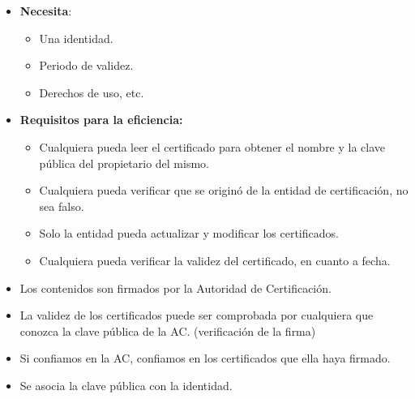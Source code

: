 \documentclass[12pt, twoside, openright]{report} %
\begin{document}
\begin{itemize}
\begin{itemize}
		            \begin{itemize}
			            \item \textbf{Necesita}:
			                  \begin{itemize}
				                  \item Una identidad.
				                  \item Periodo de validez.
				                  \item Derechos de uso, etc.
			                  \end{itemize}
			            \item \textbf{Requisitos para la eficiencia:}
			                  \begin{itemize}
				                  \item Cualquiera pueda leer el certificado para obtener el nombre y la clave pública del propietario del mismo.
				                  \item Cualquiera pueda verificar que se originó de la entidad de certificación, no sea falso.
				                  \item Solo la entidad pueda actualizar y modificar los certificados.
				                  \item Cualquiera pueda verificar la validez del certificado, en cuanto a fecha.
			                  \end{itemize}
			            \item Los contenidos son firmados por la Autoridad de Certificación.
			            \item La validez de los certificados puede ser comprobada por cualquiera que conozca la clave pública de la AC. (verificación de la firma)
			            \item Si confiamos en la AC, confiamos en los certificados que ella haya firmado.
			            \item Se asocia la clave pública con la identidad.
		            \end{itemize}
	      \end{itemize}
\end{itemize}
\end{document}
